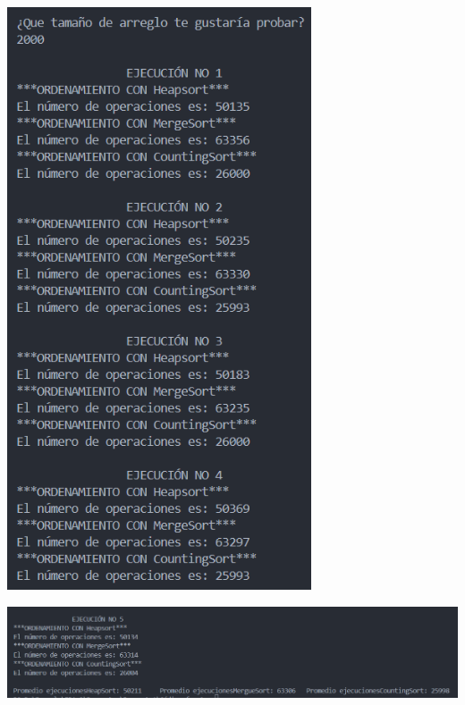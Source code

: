 \documentclass[12pt]{article}
\begin{document}
\includegraphics[width=9cm]{Images/Tam.2000/1.png}
\par\vspace{0.4cm}
\includegraphics[width=16cm]{Images/Tam.2000/2.png}
\par\vspace{0.4cm}
\end{document}
